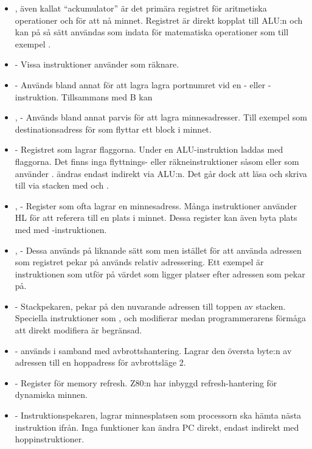 \documentclass[main.tex]{subfiles}
\begin{document}
\begin{itemize}
    \item {}, även kallat ``ackumulator'' är det primära registret för
        aritmetiska operationer och för att nå minnet. Registret är direkt
        kopplat till ALU:n och kan på så sätt användas som indata för
        matematiska operationer som till exempel .
    \item {} - Vissa instruktioner använder  som räknare.
    \item {} - Används bland annat för att lagra lagra portnumret vid en
        - eller -instruktion. Tillsammans med B kan
    \item {},  - Används bland annat parvis för att lagra
        minnesadresser. Till exempel som destinationsadress för 
        som flyttar ett block i minnet.
    \item {} - Registret som lagrar flaggorna. Under en ALU-instruktion
        laddas  med flaggorna. Det finns inga flyttnings- eller
        räkneinstruktioner såsom  eller  som använder
        .  ändras endast indirekt via ALU:n. Det går dock att
        läsa och skriva till  via stacken med  och
        .
    \item {},  - Register som ofta lagrar en minnesadress. Många
        instruktioner använder HL för att referera till en plats i minnet.
        Dessa register kan även byta plats med  med -instruktionen.
    \item {},  - Dessa används på liknande sätt som 
        men istället för att använda adressen som registret pekar på används
        relativ adressering. Ett exempel är instruktionen  som
        utför  på värdet som ligger  platser efter adressen
        som  pekar på.
    \item {} - Stackpekaren, pekar på den nuvarande adressen till toppen
        av stacken. Speciella instruktioner som ,  och
         modifierar  medan programmerarens förmåga att
        direkt modifiera  är begränsad.
    \item {} -  används i samband med avbrottshantering. Lagrar
        den översta byte:n av adressen till en hoppadress för avbrottsläge 2.
    \item {} - Register för memory refresh. Z80:n har inbyggd
        refresh-hantering för dynamiska minnen.
    \item {} - Instruktionspekaren, lagrar minnesplatsen som processorn
        ska hämta nästa instruktion ifrån. Inga funktioner kan ändra PC direkt,
        endast indirekt med hoppinstruktioner.
\end{itemize}
\end{document}

